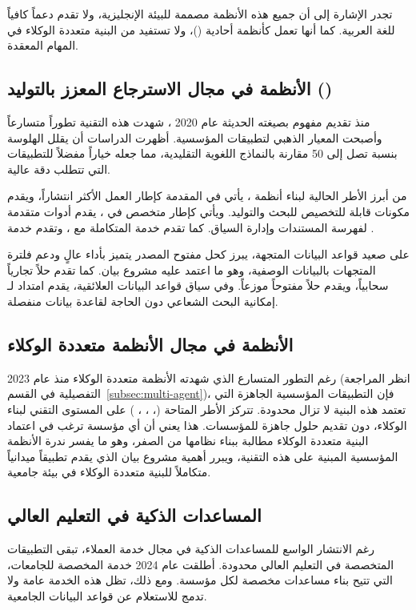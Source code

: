 تجدر الإشارة إلى أن جميع هذه الأنظمة مصممة للبيئة الإنجليزية، ولا تقدم دعماً
كافياً للغة العربية. كما أنها تعمل كأنظمة أحادية ()، ولا
تستفيد من البنية متعددة الوكلاء في المهام المعقدة.

\subsection{الأنظمة في مجال الاسترجاع المعزز بالتوليد ()}
\label{subsec:related-rag}
منذ تقديم مفهوم  بصيغته الحديثة عام 2020 \cite{lewis2020rag}، شهدت
هذه التقنية تطوراً متسارعاً وأصبحت المعيار الذهبي لتطبيقات  المؤسسية.
أظهرت الدراسات أن  يقلل الهلوسة بنسبة تصل إلى 50\LR{\%} مقارنة بالنماذج
اللغوية التقليدية، مما جعله خياراً مفضلاً للتطبيقات التي تتطلب دقة عالية.

من أبرز الأطر الحالية لبناء أنظمة ، يأتي 
\cite{langchain2023} في المقدمة كإطار العمل الأكثر انتشاراً، ويقدم مكونات
قابلة للتخصيص للبحث والتوليد. ويأتي  \cite{llamaindex2023}
كإطار متخصص في ، يقدم أدوات متقدمة لفهرسة المستندات وإدارة السياق.
كما تقدم  خدمة  المتكاملة مع ،
وتقدم  خدمة .

على صعيد قواعد البيانات المتجهة، يبرز  \cite{qdrant2024} كحل
مفتوح المصدر يتميز بأداء عالٍ ودعم فلترة المتجهات بالبيانات الوصفية، وهو ما
اعتمد عليه مشروع بيان. كما تقدم  حلاً تجارياً سحابياً، ويقدم
 حلاً مفتوحاً موزعاً. وفي سياق قواعد البيانات العلائقية، يقدم
امتداد  لـ  إمكانية البحث الشعاعي دون الحاجة
لقاعدة بيانات منفصلة.

\subsection{الأنظمة في مجال الأنظمة متعددة الوكلاء}
\label{subsec:related-multi-agent}
رغم التطور المتسارع الذي شهدته الأنظمة متعددة الوكلاء منذ عام 2023 (انظر
المراجعة التفصيلية في القسم~\ref{subsec:multi-agent})، فإن التطبيقات المؤسسية
الجاهزة التي تعتمد هذه البنية لا تزال محدودة. تتركز الأطر المتاحة
(، ، ، ) على المستوى
التقني لبناء الوكلاء، دون تقديم حلول جاهزة للمؤسسات. هذا يعني أن أي مؤسسة
ترغب في اعتماد البنية متعددة الوكلاء مطالبة ببناء نظامها من الصفر، وهو ما يفسر
ندرة الأنظمة المؤسسية المبنية على هذه التقنية، ويبرر أهمية مشروع بيان الذي
يقدم تطبيقاً ميدانياً متكاملاً للبنية متعددة الوكلاء في بيئة جامعية.

\subsection{المساعدات الذكية في التعليم العالي}
\label{subsec:related-edu-ai}
رغم الانتشار الواسع للمساعدات الذكية في مجال خدمة العملاء، تبقى التطبيقات
المتخصصة في التعليم العالي محدودة. أطلقت  عام 2024 خدمة
 المخصصة للجامعات، التي تتيح بناء مساعدات مخصصة لكل مؤسسة.
ومع ذلك، تظل هذه الخدمة عامة ولا تدمج  للاستعلام عن قواعد البيانات
الجامعية.

